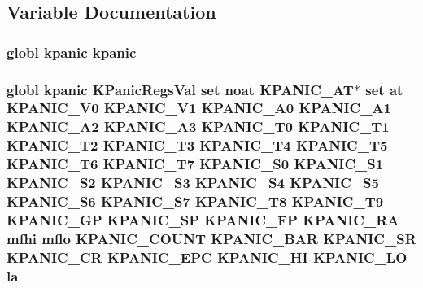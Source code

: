 \subsection{Variable Documentation}
\hypertarget{mips_2kpanica_8S_a7f530336b5f1563eee0a1052ea0d4a9b}{
\subsubsection[{kpanic}]{\setlength{\rightskip}{0pt plus 5cm}globl kpanic kpanic}}\label{mips_2kpanica_8S_a7f530336b5f1563eee0a1052ea0d4a9b}
\hypertarget{mips_2kpanica_8S_a2fb13edcab8f873099119dfe01c49d47}{
\subsubsection[{la}]{\setlength{\rightskip}{0pt plus 5cm}globl {\bf kpanic} {\bf K\-Panic\-Regs\-Val} set noat {\bf K\-P\-A\-N\-I\-C\-\_\-\-A\-T}$\ast$ set at {\bf K\-P\-A\-N\-I\-C\-\_\-\-V0} {\bf K\-P\-A\-N\-I\-C\-\_\-\-V1} {\bf K\-P\-A\-N\-I\-C\-\_\-\-A0} {\bf K\-P\-A\-N\-I\-C\-\_\-\-A1} {\bf K\-P\-A\-N\-I\-C\-\_\-\-A2} {\bf K\-P\-A\-N\-I\-C\-\_\-\-A3} {\bf K\-P\-A\-N\-I\-C\-\_\-\-T0} {\bf K\-P\-A\-N\-I\-C\-\_\-\-T1} {\bf K\-P\-A\-N\-I\-C\-\_\-\-T2} {\bf K\-P\-A\-N\-I\-C\-\_\-\-T3} {\bf K\-P\-A\-N\-I\-C\-\_\-\-T4} {\bf K\-P\-A\-N\-I\-C\-\_\-\-T5} {\bf K\-P\-A\-N\-I\-C\-\_\-\-T6} {\bf K\-P\-A\-N\-I\-C\-\_\-\-T7} {\bf K\-P\-A\-N\-I\-C\-\_\-\-S0} {\bf K\-P\-A\-N\-I\-C\-\_\-\-S1} {\bf K\-P\-A\-N\-I\-C\-\_\-\-S2} {\bf K\-P\-A\-N\-I\-C\-\_\-\-S3} {\bf K\-P\-A\-N\-I\-C\-\_\-\-S4} {\bf K\-P\-A\-N\-I\-C\-\_\-\-S5} {\bf K\-P\-A\-N\-I\-C\-\_\-\-S6} {\bf K\-P\-A\-N\-I\-C\-\_\-\-S7} {\bf K\-P\-A\-N\-I\-C\-\_\-\-T8} {\bf K\-P\-A\-N\-I\-C\-\_\-\-T9} {\bf K\-P\-A\-N\-I\-C\-\_\-\-G\-P} {\bf K\-P\-A\-N\-I\-C\-\_\-\-S\-P} {\bf K\-P\-A\-N\-I\-C\-\_\-\-F\-P} {\bf K\-P\-A\-N\-I\-C\-\_\-\-R\-A} mfhi mflo {\bf K\-P\-A\-N\-I\-C\-\_\-\-C\-O\-U\-N\-T} {\bf K\-P\-A\-N\-I\-C\-\_\-\-B\-A\-R} {\bf K\-P\-A\-N\-I\-C\-\_\-\-S\-R} {\bf K\-P\-A\-N\-I\-C\-\_\-\-C\-R} {\bf K\-P\-A\-N\-I\-C\-\_\-\-E\-P\-C} {\bf K\-P\-A\-N\-I\-C\-\_\-\-H\-I} {\bf K\-P\-A\-N\-I\-C\-\_\-\-L\-O} la}}\label{mips_2kpanica_8S_a2fb13edcab8f873099119dfe01c49d47}
